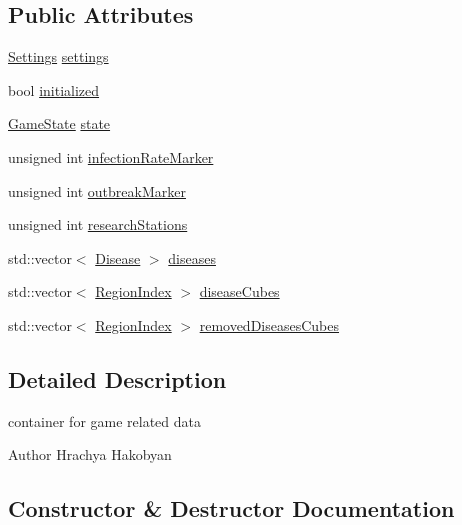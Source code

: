 \subsection*{Public Attributes}
\begin{DoxyCompactItemize}
\item 
\hyperlink{classpan_1_1_settings}{Settings} \hyperlink{structpan_1_1_game_data_ab907cda56d6df33bedbf6d3c617d6a64}{settings}
\item 
bool \hyperlink{structpan_1_1_game_data_aad23d9b004b01784e7bb2c980beb02e9}{initialized}
\item 
\hyperlink{namespacepan_a6f99370eda3b27c2bbe19b2dacea9212}{Game\+State} \hyperlink{structpan_1_1_game_data_a5a1dace14546bf80cac4a00e7b55d603}{state}
\item 
unsigned int \hyperlink{structpan_1_1_game_data_a4ede59b5ced4fccdeb01471a07bd8128}{infection\+Rate\+Marker}
\item 
unsigned int \hyperlink{structpan_1_1_game_data_aa7c3194057a3cb4c5d827b93c6eab7fc}{outbreak\+Marker}
\item 
unsigned int \hyperlink{structpan_1_1_game_data_a9dde961d902c84df7e6e0bba551bf858}{research\+Stations}
\item 
std\+::vector$<$ \hyperlink{classpan_1_1_disease}{Disease} $>$ \hyperlink{structpan_1_1_game_data_ad0126298791b791dd3b1f83bf6e2109d}{diseases}
\item 
std\+::vector$<$ \hyperlink{namespacepan_a648dcc32a76222a9e4cd4a3e80bda642}{Region\+Index} $>$ \hyperlink{structpan_1_1_game_data_acf99f80b705995e55eacfb79baadb749}{disease\+Cubes}
\item 
std\+::vector$<$ \hyperlink{namespacepan_a648dcc32a76222a9e4cd4a3e80bda642}{Region\+Index} $>$ \hyperlink{structpan_1_1_game_data_a84dbb9125cd228c57da05a732ef6f18f}{removed\+Diseases\+Cubes}
\end{DoxyCompactItemize}


\subsection{Detailed Description}
container for game related data 

\begin{DoxyAuthor}{Author}
Hrachya Hakobyan 
\end{DoxyAuthor}


\subsection{Constructor \& Destructor Documentation}
\mbox{\label{structpan_1_1_game_data_a4bd1e9348e4dc118d1345f25eb297006}} 
